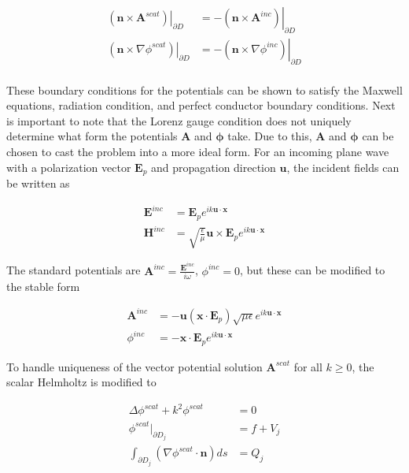 \documentclass{article}[12pt]
\newcommand{\bvec}[1]{\boldsymbol{#1}}
\begin{document}
	\begin{align*}
	\left. \left(\bvec{n} \times \bvec{A}^{scat}\right)\right|_{\partial D} &= - \left. \left(\bvec{n} \times \bvec{A}^{inc}\right)\right|_{\partial D} \\
	\left. \left(\bvec{n} \times \nabla \phi^{scat}\right)\right|_{\partial D} &= - \left. \left(\bvec{n} \times  \nabla \phi^{inc}\right)\right|_{\partial D} \\
	\end{align*}
	
	These boundary conditions for the potentials can be shown to satisfy the Maxwell equations, radiation condition, and perfect conductor boundary conditions.
	Next is important to note that the Lorenz gauge condition does not uniquely determine what form the potentials $\bvec{A}$ and $\bvec{\phi}$ take. Due to this, $\bvec{A}$ and $\bvec{\phi}$ can be chosen to cast the problem into a more ideal form. For an incoming plane wave with a polarization vector $\bvec{E}_p$ and propagation direction $\bvec{u}$, the incident fields can be written as
	
	\begin{align*}
	\bvec{E}^{inc} &= \bvec{E}_p e^{i k \bvec{u} \cdot \bvec{x}} \\
	\bvec{H}^{inc} &= \sqrt{\frac{\epsilon}{\mu}} \bvec{u} \times \bvec{E}_p e^{i k \bvec{u} \cdot \bvec{x}}
	\end{align*}
	
	The standard potentials are $\bvec{A}^{inc} = \frac{\bvec{E}^{inc}}{i \omega}$, $\phi^{inc} = 0$, but these can be modified to the stable form
	
	\begin{align*}
	\bvec{A}^{inc} &= - \bvec{u} \left( \bvec{x} \cdot \bvec{E}_p\right) \sqrt{\mu \epsilon} e^{i k \bvec{u} \cdot \bvec{x}} \\
	\phi^{inc} &= - \bvec{x} \cdot \bvec{E}_p e^{i k \bvec{u} \cdot \bvec{x} }
	\end{align*}
	
	To  handle uniqueness of the vector potential solution $\bvec{A}^{scat}$ for all $k \geq 0$, the scalar Helmholtz is modified to
	
	\begin{align*}
	\Delta \phi^{scat} + k^2 \phi^{scat} &= 0 \\
	\phi^{scat}|_{\partial D_j} &= f + V_j \\
	\int_{\partial D_j} \left( \nabla \phi^{scat} \cdot \bvec{n}\right) ds &= Q_j
	\end{align*}
	
\end{document}
